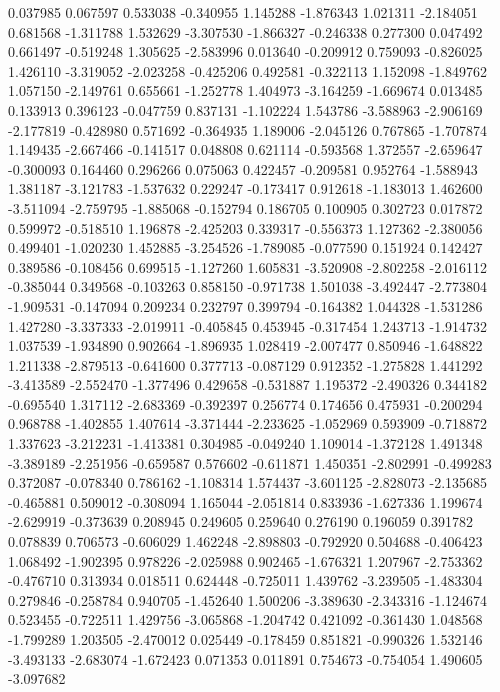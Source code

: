 0.037985
0.067597
0.533038
-0.340955
1.145288
-1.876343
1.021311
-2.184051
0.681568
-1.311788
1.532629
-3.307530
-1.866327
-0.246338
0.277300
0.047492
0.661497
-0.519248
1.305625
-2.583996
0.013640
-0.209912
0.759093
-0.826025
1.426110
-3.319052
-2.023258
-0.425206
0.492581
-0.322113
1.152098
-1.849762
1.057150
-2.149761
0.655661
-1.252778
1.404973
-3.164259
-1.669674
0.013485
0.133913
0.396123
-0.047759
0.837131
-1.102224
1.543786
-3.588963
-2.906169
-2.177819
-0.428980
0.571692
-0.364935
1.189006
-2.045126
0.767865
-1.707874
1.149435
-2.667466
-0.141517
0.048808
0.621114
-0.593568
1.372557
-2.659647
-0.300093
0.164460
0.296266
0.075063
0.422457
-0.209581
0.952764
-1.588943
1.381187
-3.121783
-1.537632
0.229247
-0.173417
0.912618
-1.183013
1.462600
-3.511094
-2.759795
-1.885068
-0.152794
0.186705
0.100905
0.302723
0.017872
0.599972
-0.518510
1.196878
-2.425203
0.339317
-0.556373
1.127362
-2.380056
0.499401
-1.020230
1.452885
-3.254526
-1.789085
-0.077590
0.151924
0.142427
0.389586
-0.108456
0.699515
-1.127260
1.605831
-3.520908
-2.802258
-2.016112
-0.385044
0.349568
-0.103263
0.858150
-0.971738
1.501038
-3.492447
-2.773804
-1.909531
-0.147094
0.209234
0.232797
0.399794
-0.164382
1.044328
-1.531286
1.427280
-3.337333
-2.019911
-0.405845
0.453945
-0.317454
1.243713
-1.914732
1.037539
-1.934890
0.902664
-1.896935
1.028419
-2.007477
0.850946
-1.648822
1.211338
-2.879513
-0.641600
0.377713
-0.087129
0.912352
-1.275828
1.441292
-3.413589
-2.552470
-1.377496
0.429658
-0.531887
1.195372
-2.490326
0.344182
-0.695540
1.317112
-2.683369
-0.392397
0.256774
0.174656
0.475931
-0.200294
0.968788
-1.402855
1.407614
-3.371444
-2.233625
-1.052969
0.593909
-0.718872
1.337623
-3.212231
-1.413381
0.304985
-0.049240
1.109014
-1.372128
1.491348
-3.389189
-2.251956
-0.659587
0.576602
-0.611871
1.450351
-2.802991
-0.499283
0.372087
-0.078340
0.786162
-1.108314
1.574437
-3.601125
-2.828073
-2.135685
-0.465881
0.509012
-0.308094
1.165044
-2.051814
0.833936
-1.627336
1.199674
-2.629919
-0.373639
0.208945
0.249605
0.259640
0.276190
0.196059
0.391782
0.078839
0.706573
-0.606029
1.462248
-2.898803
-0.792920
0.504688
-0.406423
1.068492
-1.902395
0.978226
-2.025988
0.902465
-1.676321
1.207967
-2.753362
-0.476710
0.313934
0.018511
0.624448
-0.725011
1.439762
-3.239505
-1.483304
0.279846
-0.258784
0.940705
-1.452640
1.500206
-3.389630
-2.343316
-1.124674
0.523455
-0.722511
1.429756
-3.065868
-1.204742
0.421092
-0.361430
1.048568
-1.799289
1.203505
-2.470012
0.025449
-0.178459
0.851821
-0.990326
1.532146
-3.493133
-2.683074
-1.672423
0.071353
0.011891
0.754673
-0.754054
1.490605
-3.097682
